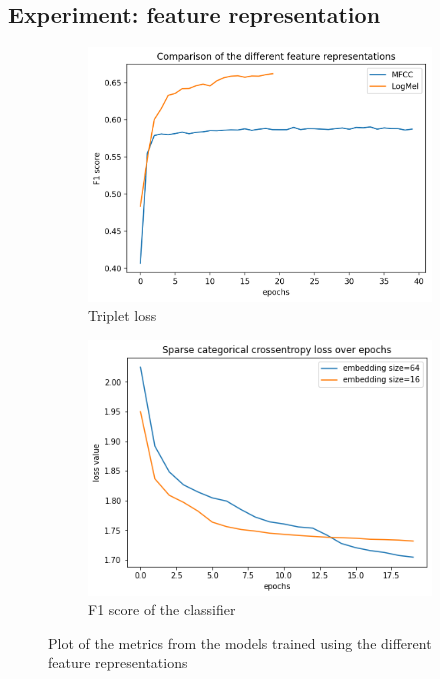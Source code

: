 \subsection{Experiment: feature representation}
\begin{figure}[htb]
\captionsetup{format=plain}
\centering
\begin{subfigure}{.5\linewidth}
  \centering
  \includegraphics[width=.9\linewidth]{study-doc/experiment_feature/assets/f1_feature_representation.png}
  \caption{Triplet loss}
  \label{fig:plot-triplet-loss-feature-representations}
\end{subfigure}%
\begin{subfigure}{.5\linewidth}
  \centering
  \includegraphics[width=.9\linewidth]{study-doc/experiment_embedding_size/assets/classifier_loss.png}
  \caption{F1 score of the classifier}
  \label{fig:classifier-f1-feature-represenations}
\end{subfigure}
\caption{Plot of the metrics from the models trained using the different feature representations}
\label{fig:feature-experiment-metrics}
\end{figure}
